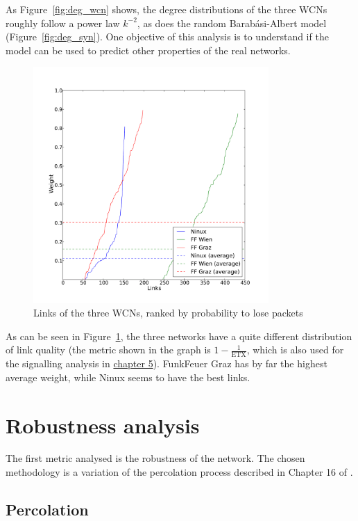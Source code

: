 \documentclass[a4paper,11pt,twoside,openright]{memoir}
\newcommand{\figref}[1] {Figure~\ref{#1}}
\newcommand{\etx}{\mathrm{ETX}}
\begin{document}
As \figref{fig:deg_wcn}
shows, the degree distributions of the three WCNs
roughly follow a power law $k^{-2}$, as does the random Barabási-Albert
model (\figref{fig:deg_syn}).
One objective of this analysis is to understand if the model can
be used to predict other properties of the real networks.

\begin{figure}[htb]
\centering
\includegraphics[width=0.8\textwidth]{graphs/weight_rank.pdf}
\caption{Links of the three WCNs, ranked by probability to lose packets}
\label{fig:wcn-link-ranking}
\end{figure}

As can be seen in \figref{fig:wcn-link-ranking}, the three networks have a quite
different distribution of link quality (the metric shown in the graph is
$1 - \frac{1}{\etx}$, which is also used for the signalling analysis in
\hyperref[message-propagation-analysis]{chapter 5}). FunkFeuer Graz has by far the highest average
weight, while Ninux seems to have the best links.

\chapter{Robustness analysis}\label{robustness-analysis}

The first metric analysed is the robustness of the network. The chosen
methodology is a variation of the percolation process described in
Chapter 16 of \cite{newman_networks:_2010}.

\section{Percolation}\label{percolation}
\end{document}
